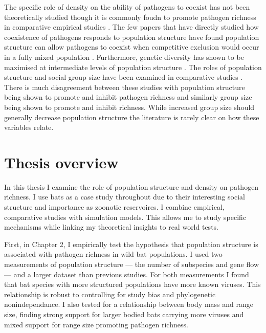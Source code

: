 The specific role of density on the ability of pathogens to coexist has not been theoretically studied though it is commonly foudn to promote pathogen richness in comparative empirical studies \cite{kamiya2014determines, nunn2003comparative, arneberg2002host}.
The few papers that have directly studied how coexistence of pathogens responds to population structure have found population structure can allow pathogens to coexist when competitive exclusion would occur in a fully mixed population \cite{qiu2013vector, allen2004sis, nunes2006localized}.
Furthermore, genetic diversity has shown to be maximised at intermediate levels of population structure \cite{campos2006pathogen}.
The roles of population structure and social group size have been examined in comparative studies \cite{maganga2014bat, gay2014parasite, turmelle2009correlates, altizer2003social, bordes2007rodent, ezenwa2006host, rifkin2012animals, vitone2004body}.
There is much disagreement between these studies with population structure being shown to promote \cite{maganga2014bat, turmelle2009correlates} and inhibit pathogen richness \cite{gay2014parasite} and similarly group size being shown to promote \cite{rifkin2012animals, bordes2007rodent} and inhibit \cite{ezenwa2006host} richness.
While increased group size should generally decrease population structure the literature is rarely clear on how these variables relate.




\section{Thesis overview}

In this thesis I examine the role of population structure and density on pathogen richness.
I use bats as a case study throughout due to their interesting social structure and importance as zoonotic	reservoires.
I combine empirical, comparative studies with simulation models.
This allows me to study specific mechanisms while linking my theoretical insights to real world tests.



First, in Chapter 2, I empirically test the hypothesis that population structure is associated with pathogen richness in wild bat populations.
I used two measurements of population structure --- the number of subspecies and gene flow --- and a larger dataset than previous studies.
For both measurements I found that bat species with more structured populations have more known viruses.
This relationship is robust to controlling for study bias and phylogenetic nonindependance.
I also tested for a relationship between body mass and range size, finding strong support for larger bodied bats carrying more viruses and mixed support for range size promoting pathogen richness.

